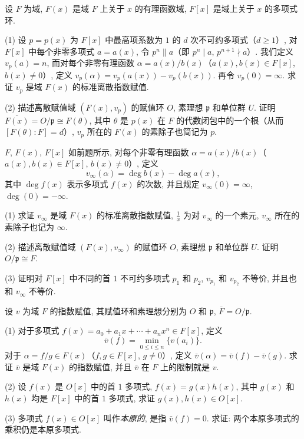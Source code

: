\begin{Exercises}
\item 设 $F$ 为域, $F(x)$ 是域 $F$ 上关于 $x$ 的有理函数域, $F[x]$ 是域上关于 $x$ 的多项式环.

(1) 设 $p=p(x)$ 为 $F[x]$ 中最高项系数为 $1$ 的 $d$ 次不可约多项式（$d\geqslant 1$）, 对 $F[x]$ 中每个非零多项式 $a=a(x)$, 令 $p^n\parallel a$（即 $p^n\mid a$, $p^{n+1}\nmid a$）. 我们定义 $v_p(a)=n$, 而对每个非零有理函数 $\alpha=a(x)/b(x)$（$a(x),b(x)\in F[x]$, $b(x)\neq 0$）, 定义 $v_p(\alpha)=v_p(a(x))-v_p(b(x))$. 再令 $v_p(0)=\infty$. 求证 $v_p$ 是域 $F(x)$ 的标准离散指数赋值.

(2) 描述离散赋值域 $(F(x),v_p)$ 的赋值环 $O$, 素理想 $\mathfrak{p}$ 和单位群 $U$. 证明 $\overline{F(x)}=O/\mathfrak{p}\cong F(\theta)$, 其中 $\theta$ 是 $p(x)$ 在 $F$ 的代数闭包中的一个根（从而 $[F(\theta):F]=d$）, $v_p$ 所在的 $F(x)$ 的素除子也简记为 $p$.

\item $F$, $F(x)$, $F[x]$ 如前题所示, 对每个非零有理函数 $\alpha=a(x)/b(x)$（$a(x),b(x)\in F[x]$, $b(x)\neq 0$）, 定义
\[
  v_{\infty}(\alpha)=\deg b(x)-\deg a(x),
\]
其中 $\deg f(x)$ 表示多项式 $f(x)$ 的次数, 并且规定 $v_{\infty}(0)=\infty$, $\deg(0)=-\infty$.

(1) 求证 $v_{\infty}$ 是域 $F(x)$ 的标准离散指数赋值, $\frac{1}{x}$ 为对 $v_{\infty}$ 的一个素元, $v_{\infty}$ 所在的素除子也记为 $\infty$.

(2) 描述离散赋值域 $(F(x),v_{\infty})$ 的赋值环 $O$, 素理想 $\mathfrak{p}$ 和单位群 $U$. 证明 $O/\mathfrak{p}\cong F$.

(3) 证明对 $F[x]$ 中不同的首 $1$ 不可约多项式 $p_1$ 和 $p_2$, $v_{p_1}$ 和 $v_{p_2}$ 不等价, 并且也和 $v_{\infty}$ 不等价.

\item 设 $v$ 为域 $F$ 的指数赋值, 其赋值环和素理想分别为 $O$ 和 $\mathfrak{p}$, $\overline{F}=O/\mathfrak{p}$.

(1) 对于多项式 $f(x)=a_0+a_1x+\cdots+a_nx^n\in F[x]$, 定义
\[
  \bar{v}(f)=\min_{0\leqslant i\leqslant n}\{v(a_i)\}.
\]
对于 $\alpha=f/g\in F(x)$（$f,g\in F[x]$, $g\neq 0$）, 定义 $\bar{v}(\alpha)=\bar{v}(f)-\bar{v}(g)$. 求证 $\bar{v}$ 是域 $F(x)$ 的指数赋值, 并且 $\bar{v}$ 在 $F$ 上的限制就是 $v$.

(2) 设 $f(x)$ 是 $O[x]$ 中的首 $1$ 多项式, $f(x)=g(x)h(x)$, 其中 $g(x)$ 和 $h(x)$ 均是 $F[x]$ 中的首 $1$ 多项式, 求证 $g(x),h(x)\in O[x]$.

(3) 多项式 $f(x)\in O[x]$ 叫作\emph{本原的}, 是指 $\bar{v}(f)=0$. 求证: 两个本原多项式的乘积仍是本原多项式.


\end{Exercises}
